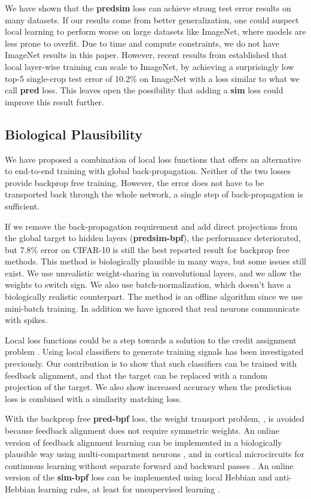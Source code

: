 \documentclass{article}
\begin{document}
We have shown that the \textbf{predsim} loss can achieve strong test error results on many datasets. If our results come from better generalization, one could suspect local learning to perform worse on large datasets like ImageNet, where models are less prone to overfit. Due to time and compute constraints, we do not have ImageNet results in this paper. However, recent results from \cite{BelilovskyEO18} established that local layer-wise training can scale to ImageNet, by achieving a surprisingly low top-5 single-crop test error of 10.2\% on ImageNet with a loss similar to what we call \textbf{pred} loss. This leaves open the possibility that adding a \textbf{sim} loss could improve this result further. 

\subsection{Biological Plausibility}

We have proposed a combination of local loss functions that offers an alternative to end-to-end training with global back-propagation. Neither of the two losses provide backprop free training. However, the error does not have to be transported back through the whole network, a single step of back-propagation is sufficient. 

If we remove the back-propagation requirement and add direct projections from the global target to hidden layers (\textbf{predsim-bpf}), the performance deteriorated, but 7.8\% error on CIFAR-10 is still the best reported result for backprop free methods. This method is biologically plausible in many ways, but some issues still exist. We use unrealistic weight-sharing in convolutional layers, and we allow the weights to switch sign. We also use batch-normalization, which doesn't have a biologically realistic counterpart. The method is an offline algorithm since we use mini-batch training. In addition we have ignored that real neurons communicate with spikes.

Local loss functions could be a step towards a solution to the credit assignment problem \cite{BengioLBL15}. Using local classifiers to generate training signals has been investigated previously. Our contribution is to show that such classifiers can be trained with feedback alignment, and that the target can be replaced with a random projection of the target. We also show increased accuracy when the prediction loss is combined with a similarity matching loss.

With the backprop free \textbf{pred-bpf} loss, the weight transport problem, \cite{Grossberg87}, is avoided because feedback alignment does not  require symmetric weights. An online version of feedback alignment learning can be implemented in a biologically plausible way using multi-compartment neurons \cite{GuerguievLR17}, and in cortical microcircuits for continuous learning without separate forward and backward passes \cite{Sacramento18}. An online version of the \textbf{sim-bpf} loss can be implemented using local Hebbian and anti-Hebbian learning rules, at least for unsupervised learning \cite{Pehlevan2014hebbian,PehlevanSC18, GiovannucciMPC18}. 
\end{document}
